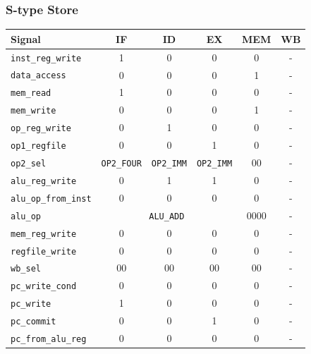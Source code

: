 \documentclass{scrartcl}
\begin{document}
\subsubsection{S-type Store}
\begin{tabularx}{\textwidth}{ | X | c | c | c | c | c | }
  \hline
  \textbf{Signal} & \textbf{IF} & \textbf{ID} & \textbf{EX} & \textbf{MEM} & \textbf{WB} \\ \hline
  \texttt{inst\_reg\_write} & 1 & 0 & 0 & 0 & - \\ \hline
  \texttt{data\_access} & 0 & 0 & 0 & 1 & - \\ \hline
  \texttt{mem\_read} & 1 & 0 & 0 & 0 & - \\ \hline
  \texttt{mem\_write} & 0 & 0 & 0 & 1 & - \\ \hline
  \texttt{op\_reg\_write} & 0 & 1 & 0 & 0 & - \\ \hline
  \texttt{op1\_regfile} & 0 & 0 & 1 & 0 & - \\ \hline
  \texttt{op2\_sel} & \texttt{OP2\_FOUR} & \texttt{OP2\_IMM} & \texttt{OP2\_IMM} & 00 & - \\ \hline
  \texttt{alu\_reg\_write} & 0 & 1 & 1 & 0 & - \\ \hline
  \texttt{alu\_op\_from\_inst} & 0 & 0 & 0 & 0 & - \\ \hline
  \texttt{alu\_op} & \multicolumn{3}{c|}{\texttt{ALU\_ADD}} & 0000 & - \\ \hline
  \texttt{mem\_reg\_write} & 0 & 0 & 0 & 0 & - \\ \hline
  \texttt{regfile\_write} & 0 & 0 & 0 & 0 & - \\ \hline
  \texttt{wb\_sel} & 00 & 00 & 00 & 00 & - \\ \hline
  \texttt{pc\_write\_cond} & 0 & 0 & 0 & 0 & - \\ \hline
  \texttt{pc\_write} & 1 & 0 & 0 & 0 & - \\ \hline
  \texttt{pc\_commit} & 0 & 0 & 1 & 0 & - \\ \hline
  \texttt{pc\_from\_alu\_reg} & 0 & 0 & 0 & 0 & - \\ \hline
\end{tabularx}
\end{document}
